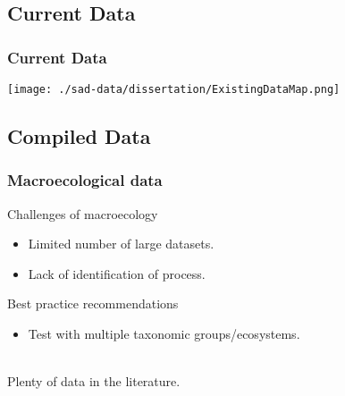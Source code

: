 \documentclass[14pt]{beamer}
\begin{document}
\subsection{Current Data}
\begin{frame}[t]
\frametitle{Current Data}
\vspace{-7pt}
\begin{center}
\texttt{[image: ./sad-data/dissertation/ExistingDataMap.png]}
\end{center}
\end{frame}


\subsection{Compiled Data}
\begin{frame}[t]
\frametitle{Macroecological data}
Challenges of macroecology\\
\begin{small}
\begin{itemize}
\item Limited number of large datasets.
\item Lack of identification of process.
\end{itemize}
\end{small}
Best practice recommendations
\begin{small}
\begin{itemize}
\item Test with multiple taxonomic groups/ecosystems. 
\end{itemize}
\end{small} 
\begin{large}
~\\
Plenty of data in the literature.
\end{large}
\end{frame}
\end{document}
